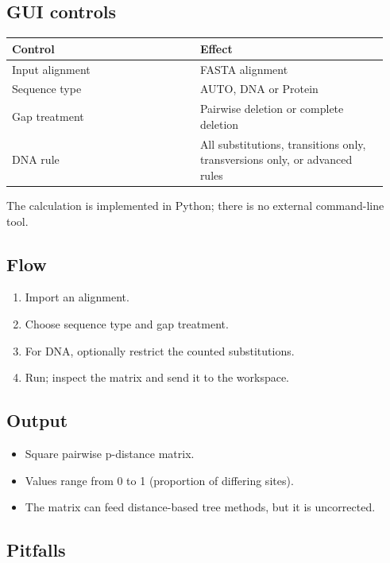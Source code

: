 \documentclass[11pt]{report}
\begin{document}
\subsection{GUI controls}

{\footnotesize
\begin{longtable}{@{}>{\raggedright\arraybackslash}p{0.47\linewidth}>{\raggedright\arraybackslash}p{0.47\linewidth}@{}}
\toprule
Control & Effect \\
\midrule
\endhead
Input alignment & FASTA alignment \\
Sequence type & AUTO, DNA or Protein \\
Gap treatment & Pairwise deletion or complete deletion \\
DNA rule & All substitutions, transitions only, transversions only, or advanced rules \\
\bottomrule
\end{longtable}
}

The calculation is implemented in Python; there is no external command-line tool.

\subsection{Flow}

\begin{enumerate}
  \item Import an alignment.
  \item Choose sequence type and gap treatment.
  \item For DNA, optionally restrict the counted substitutions.
  \item Run; inspect the matrix and send it to the workspace.
\end{enumerate}

\subsection{Output}

\begin{itemize}
  \item Square pairwise p-distance matrix.
  \item Values range from 0 to 1 (proportion of differing sites).
  \item The matrix can feed distance-based tree methods, but it is uncorrected.
\end{itemize}

\subsection{Pitfalls}
\end{document}
